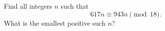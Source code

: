 Find all integers $n$ such that
\[
617n\equiv943n\pmod{18}.
\]
What is the smallest positive such $n$?
